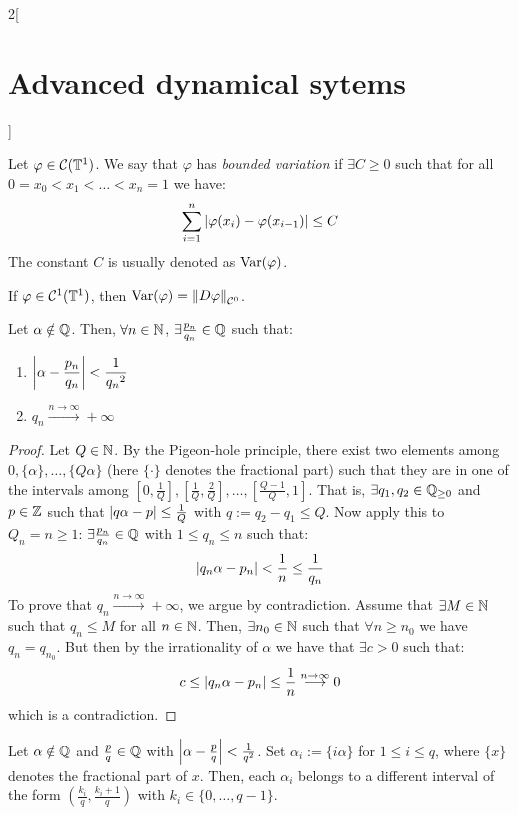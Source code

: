 \documentclass[../../../main_math.tex]{subfiles}
\begin{document}
\begin{multicols}{2}[\section{Advanced dynamical sytems}]
\begin{definition}
    Let $\varphi\in\mathcal{C}(\mathbb{T}^1)$. We say that $\varphi$ has \emph{bounded variation} if $\exists C\geq 0$ such that for all $0=x_0<x_1<\dots<x_n=1$ we have:
    $$
      \sum_{i=1}^n\abs{\varphi(x_i)-\varphi(x_{i-1})}\leq C
    $$
    The constant $C$ is usually denoted as $\mathrm{Var}(\varphi)$.
  \end{definition}
  \begin{remark}
    If $\varphi\in\mathcal{C}^1(\mathbb{T}^1)$, then $\mathrm{Var}(\varphi)=\left\|D\varphi\right\|_{\mathcal{C}^0}$.
  \end{remark}
  \begin{lemma}\label{ADS:lema_pnqn}
    Let $\alpha\notin\mathbb{Q}$. Then, $\forall n\in\mathbb{N}$, $\exists \frac{p_n}{q_n}\in\mathbb{Q}$ such that:
    \begin{enumerate}
      \item $\displaystyle\abs{\alpha-\frac{p_n}{q_n}}<\frac{1}{{q_n}^2}$
      \item $q_n\overset{n\to\infty}{\longrightarrow}+\infty$
    \end{enumerate}
  \end{lemma}
  \begin{proof}
    Let $Q\in\mathbb{N}$. By the Pigeon-hole principle, there exist two elements among $0,\{\alpha\},\ldots,\{Q \alpha\}$ (here $\{\cdot\}$ denotes the fractional part) such that they are in one of the intervals among $\left[0,\frac{1}{Q}\right], \left[\frac{1}{Q},\frac{2}{Q}\right],\ldots,\left[\frac{Q-1}{Q},1\right]$. That is, $\exists q_1,q_2\in\mathbb{Q}_{\geq 0}$ and $p\in\mathbb{Z}$ such that $\abs{q\alpha -p}\leq \frac{1}{Q}$ with $q:=q_2-q_1\leq Q$. Now apply this to $Q_n=n\geq 1$: $\exists \frac{p_n}{q_n}\in \mathbb{Q}$ with $1\leq q_n\leq n$ such that:
    $$
      \abs{q_n\alpha-p_n}<\frac{1}{n}\leq \frac{1}{q_n}
    $$
    To prove that $q_n\overset{n\to\infty}{\longrightarrow}+\infty$, we argue by contradiction. Assume that $\exists M\in\mathbb{N}$ such that $q_n\leq M$ for all $n\in\mathbb{N}$. Then, $\exists n_0\in\mathbb{N}$ such that $\forall n\geq n_0$ we have $q_n=q_{n_0}$. But then by the irrationality of $\alpha$ we have that $\exists c>0$ such that:
    $$
      c\leq \abs{q_n\alpha-p_n}\leq \frac{1}{n} \overset{n\to\infty}{\longrightarrow} 0
    $$
    which is a contradiction.
  \end{proof}
  \begin{lemma}\label{ADS:lema_alpha_i}
    Let $\alpha\notin\mathbb{Q}$ and $\frac{p}{q}\in \mathbb{Q}$ with $\abs{\alpha-\frac{p}{q}}<\frac{1}{q^2}$. Set $\alpha_i:=\{i\alpha\}$ for $1\leq i\leq q$, where $\{x\}$ denotes the fractional part of $x$. Then, each $\alpha_i$ belongs to a different interval of the form $\left(\frac{k_i}{q},\frac{k_i+1}{q}\right)$ with $k_i\in\{0,\ldots,q-1\}$.

\end{lemma}
\end{multicols}
\end{document}
